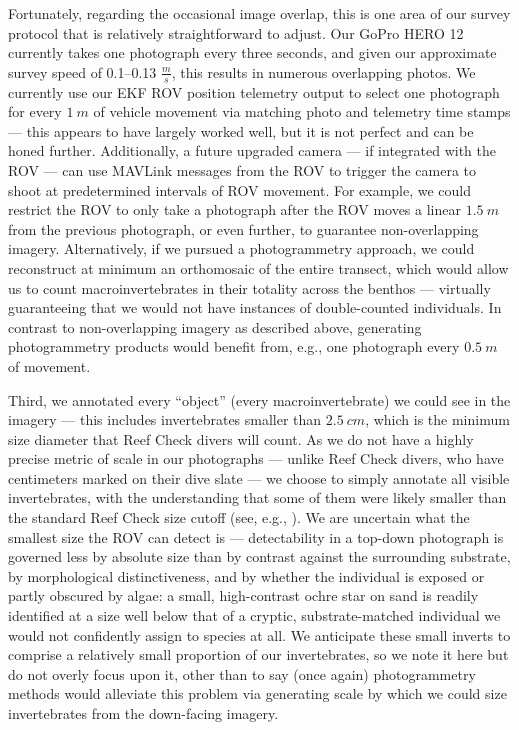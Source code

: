 \documentclass[11pt]{article}
\newcommand{\boxedref}[2]{%
	\begingroup
	\setlength{\fboxrule}{0.8pt}%
	\setlength{\fboxsep}{1.5pt}%
	\textcolor{linkcyan}{%
		\fbox{%
			\textcolor{black}{%
				\hyperref[#2]{#1~\ref*{#2}}%
			}%
		}%
	}%
	\endgroup
}
\newcommand{\figref}[1]{\boxedref{Fig.}{#1}}\newcommand{\tabref}[1]{\boxedref{Table}{#1}}
\begin{document}
Fortunately, regarding the occasional image overlap, this is one area of our 
survey protocol that is relatively straightforward to adjust. 
Our GoPro HERO 12 currently takes one photograph every three seconds, and given 
our approximate survey speed of 0.1--0.13 $\frac{m}{s}$, this results in 
numerous overlapping photos. 
We currently use our EKF ROV position telemetry output to select one photograph 
for every $1~m$ of vehicle movement via matching photo and telemetry time 
stamps --- this appears to have largely worked well, but it is not perfect and 
can be honed further. 
Additionally, a future upgraded camera --- if integrated with the ROV --- can 
use MAVLink messages from the ROV to trigger the camera to shoot at 
predetermined intervals of ROV movement. 
For example, we could restrict the ROV to only take a photograph after the ROV 
moves a linear $1.5~m$ from the previous photograph, or even further, to 
guarantee non-overlapping imagery. 
Alternatively, if we pursued a photogrammetry approach, we could reconstruct at 
minimum an orthomosaic of the entire transect, which would allow us to count 
macroinvertebrates in their totality across the benthos --- virtually 
guaranteeing that we would not have instances of double-counted individuals. 
In contrast to non-overlapping imagery as described above, generating 
photogrammetry products would benefit from, e.g., one photograph every $0.5~m$ 
of movement. 

Third, we annotated every ``object'' (every macroinvertebrate) we could see in
the imagery --- this includes invertebrates smaller than $2.5~cm$, which is the 
minimum size diameter that Reef Check divers will count. 
As we do not have a highly precise metric of scale in our photographs --- unlike
Reef Check divers, who have centimeters marked on their dive slate --- we 
choose to simply annotate all visible invertebrates, with the understanding 
that some of them were likely smaller than the standard Reef Check size cutoff 
(see, e.g., \figref{fig:too_small}). 
We are uncertain what the smallest size the ROV can detect is --- detectability 
in a top-down photograph is governed less by absolute size than by contrast 
against the surrounding substrate, by morphological distinctiveness, and by 
whether the individual is exposed or partly obscured by algae: a small, 
high-contrast ochre star on sand is readily identified at a size well below 
that of a cryptic, substrate-matched individual we would not confidently assign 
to species at all.
We anticipate these small inverts to comprise a relatively small proportion of
our invertebrates, so we note it here but do not overly focus upon it, other
than to say (once again) photogrammetry methods would alleviate this problem
via generating scale by which we could size invertebrates from the down-facing
imagery.
\end{document}
